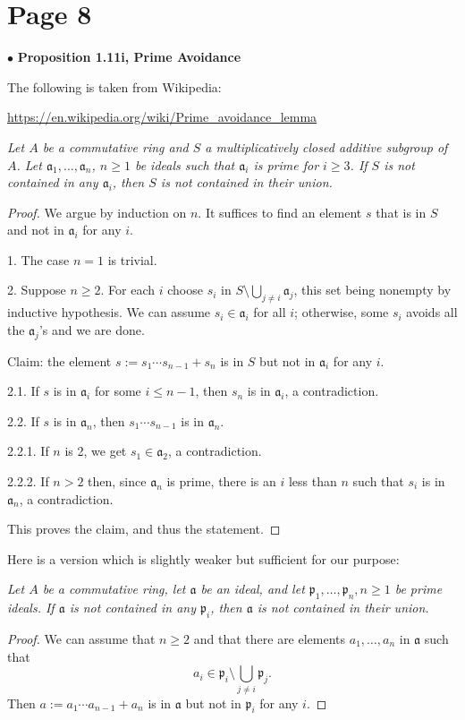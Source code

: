 \documentclass[parskip=half]{scrartcl}%
\newcommand{\mf}{\mathfrak}
\newcommand{\bu}{\bullet}
\begin{document}
\section{Page 8}%

$\bu$ \textbf{\Large Proposition 1.11i, Prime Avoidance}%

The following is taken from Wikipedia:

\href{https://en.wikipedia.org/wiki/Prime_avoidance_lemma}{https://en.wikipedia.org/wiki/Prime\_avoidance\_lemma}

\emph{Let $A$ be a commutative ring and $S$ a multiplicatively closed additive subgroup of $A$. Let $\mf a_1,\dots,\mf a_n$, $n\ge1$ be ideals such that $\mf a_i$ is prime for $i\ge3$. If $S$ is not contained in any $\mf a_i$, then $S$ is not contained in their union.}

\begin{proof} 
We argue by induction on $n$. It suffices to find an element $s$ that is in $S$ and not in $\mf a_i$ for any $i$. 

1. The case $n=1$ is trivial. 

2. Suppose $n\ge2$. For each $i$ choose $s_i$ in $S\setminus\bigcup_{j \ne i}\mf a_j$, this set being nonempty by inductive hypothesis. We can assume $s_i \in \mf a_i$ for all $i$; otherwise, some $s_i$ avoids all the $\mf a_j$'s and we are done. 

Claim: the element $s:=s_1\cdots s_{n-1}+s_n$ is in $S$ but not in $\mf a_i$ for any $i$. 

2.1. If $s$ is in $\mf a_i$ for some $i\le n-1$, then $s_n$ is in $\mf a_i$, a contradiction. 

2.2. If $s$ is in $\mf a_n$, then $s_1\cdots s_{n-1}$ is in $\mf a_n$. 

2.2.1. If $n$ is 2, we get $s_1\in \mf a_2$, a contradiction.

2.2.2. If $n>2$ then, since $\mf a_n$ is prime, there is an $i$ less than $n$ such that $s_i$ is in $\mf a_n$, a contradiction.

This proves the claim, and thus the statement. 
\end{proof}

Here is a version which is slightly weaker but sufficient for our purpose:

\emph{Let $A$ be a commutative ring, let $\mf a$ be an ideal, and let $\mf p_1,\dots,\mf p_n,n\ge1$ be prime ideals. If $\mf a$ is not contained in any $\mf p_i$, then $\mf a$ is not contained in their union.}

\begin{proof} 
We can assume that $n\ge2$ and that there are elements $a_1,\dots,a_n$ in $\mf a$ such that 
$$
a_i\in\mf p_i\setminus\bigcup_{j \ne i}\mf p_j.
$$ 
Then $a:=a_1\cdots a_{n-1}+a_n$ is in $\mf a$ but not in $\mf p_i$ for any $i$.
\end{proof}
\end{document}
